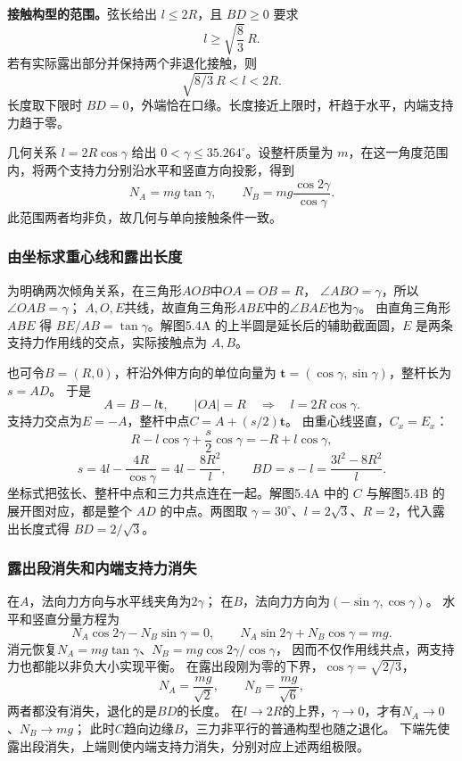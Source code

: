 \documentclass[UTF8,fontset=fandol,a4paper,11pt]{ctexart}
\newcommand{\vect}[1]{\bm{#1}}
\begin{document}
\textbf{接触构型的范围。}弦长给出 $l\le2R$，且 $BD\ge0$ 要求
\[
 l\ge\sqrt{\frac83}\,R.
\]
若有实际露出部分并保持两个非退化接触，则
\[
 \boxed{\sqrt{8/3}\,R<l<2R}.
\]
长度取下限时 $BD=0$，外端恰在口缘。长度接近上限时，杆趋于水平，内端支持力趋于零。

几何关系 $l=2R\cos\gamma$ 给出 $0<\gamma\le35.264^\circ$。设整杆质量为 $m$，在这一角度范围内，将两个支持力分别沿水平和竖直方向投影，得到
\[
 N_A=mg\tan\gamma,\qquad
 N_B=mg\frac{\cos2\gamma}{\cos\gamma}.
\]
此范围两者均非负，故几何与单向接触条件一致。
\subsubsection*{由坐标求重心线和露出长度}
为明确两次倾角关系，在三角形$AOB$中$OA=OB=R$，
$\angle ABO=\gamma$，所以$\angle OAB=\gamma$；
$A,O,E$共线，故直角三角形$ABE$中的$\angle BAE$也为$\gamma$。
由直角三角形 $ABE$ 得 $BE/AB=\tan\gamma$。解图5.4A 的上半圆是延长后的辅助截面圆，$E$ 是两条支持力作用线的交点，实际接触点为 $A,B$。

也可令$B=(R,0)$，杆沿外伸方向的单位向量为
$\vect t=(\cos\gamma,\sin\gamma)$，整杆长为$s=AD$。
于是
\[
A=B-l\vect t,\qquad |OA|=R
\quad\Longrightarrow\quad l=2R\cos\gamma.
\]
支持力交点为$E=-A$，整杆中点$C=A+(s/2)\vect t$。
由重心线竖直，$C_x=E_x$：
\[
R-l\cos\gamma+\frac s2\cos\gamma
=-R+l\cos\gamma,
\]
\[
s=4l-\frac{4R}{\cos\gamma}
=4l-\frac{8R^2}{l},\qquad
BD=s-l=\frac{3l^2-8R^2}{l}.
\]
坐标式把弦长、整杆中点和三力共点连在一起。解图5.4A 中的 $C$ 与解图5.4B 的展开图对应，都是整个 $AD$ 的中点。两图取 $\gamma=30^\circ$、$l=2\sqrt3$、$R=2$，代入露出长度式得 $BD=2/\sqrt3$。

\subsubsection*{露出段消失和内端支持力消失}
在$A$，法向力方向与水平线夹角为$2\gamma$；
在$B$，法向力方向为$(-\sin\gamma,\cos\gamma)$。
水平和竖直分量方程为
\[
N_A\cos2\gamma-N_B\sin\gamma=0,\qquad
N_A\sin2\gamma+N_B\cos\gamma=mg.
\]
消元恢复$N_A=mg\tan\gamma$、$N_B=mg\cos2\gamma/\cos\gamma$，
因而不仅作用线共点，两支持力也都能以非负大小实现平衡。
在露出段刚为零的下界，$\cos\gamma=\sqrt{2/3}$，
\[
N_A=\frac{mg}{\sqrt2},\qquad N_B=\frac{mg}{\sqrt6},
\]
两者都没有消失，退化的是$BD$的长度。
在$l\to2R$的上界，$\gamma\to0$，才有$N_A\to0$、$N_B\to mg$；
此时$C$趋向边缘$B$，三力非平行的普通构型也随之退化。
下端先使露出段消失，上端则使内端支持力消失，分别对应上述两组极限。


\end{document}
